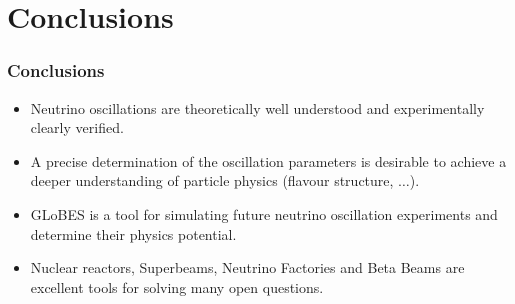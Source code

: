 \documentclass{beamer}
\begin{document}
\section*{Conclusions}

\begin{frame}
  \frametitle{Conclusions}
  \begin{itemize}
    \item Neutrino oscillations are theoretically well understood and experimentally clearly
          verified.
    \item A precise determination of the oscillation parameters is desirable to achieve a deeper
          understanding of particle physics (flavour structure, $\ldots$).
    \item GLoBES is a tool for simulating future neutrino oscillation experiments and determine their
          physics potential.
    \item Nuclear reactors, Superbeams, Neutrino Factories and Beta Beams are excellent tools
          for solving many open questions.
  \end{itemize}
\end{frame}
\end{document}

